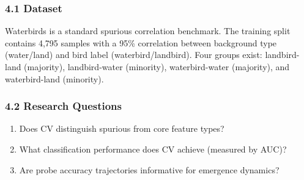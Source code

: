 
\subsubsection{4.1 Dataset}

Waterbirds \citep{sagawa2020distributionally} is a standard spurious correlation benchmark. The training split contains 4,795 samples with a 95\% correlation between background type (water/land) and bird label (waterbird/landbird). Four groups exist: landbird-land (majority), landbird-water (minority), waterbird-water (majority), and waterbird-land (minority).

\subsubsection{4.2 Research Questions}

\begin{enumerate}
\item Does CV distinguish spurious from core feature types?
\item What classification performance does CV achieve (measured by AUC)?
\item Are probe accuracy trajectories informative for emergence dynamics?
\end{enumerate}

